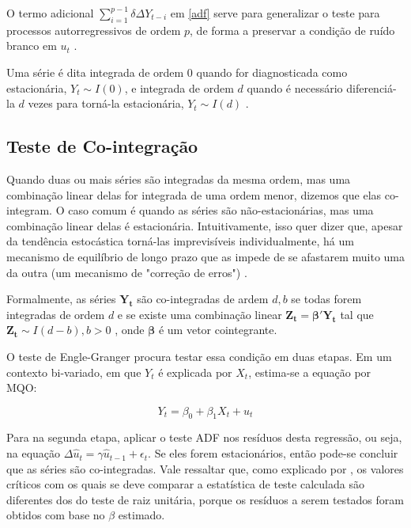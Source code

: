 \documentclass[a4paper,
               article,
               12pt,
               openany,
               oneside,
               english,
               brazil]{abntex2}
\numberwithin{equation}{section}
\begin{document}
    O termo adicional $ \sum_{i = 1}^{p-1}\delta \Delta Y_{t-i} $ em \eqref{adf} serve para generalizar o teste para processos autorregressivos de ordem $ p $, de forma a preservar a condição de ruído branco em $ u_t $ \cite[p.~40]{gustavo}.

    Uma série é dita integrada de ordem 0 quando for diagnosticada como estacionária, $ Y_t \sim I(0) $, e integrada de ordem $ d $ quando é necessário diferenciá-la $ d $ vezes para torná-la estacionária, $ Y_t \sim I(d) $ \cite[p.~740]{gujarati}.

    \subsection{Teste de Co-integração}

    Quando duas ou mais séries são integradas da mesma ordem, mas uma combinação linear delas for integrada de uma ordem menor, dizemos que elas co-integram. O caso comum é quando as séries são não-estacionárias, mas uma combinação linear delas é estacionária. Intuitivamente, isso quer dizer que, apesar da tendência estocástica torná-las imprevisíveis individualmente, há um mecanismo de equilíbrio de longo prazo que as impede de se afastarem muito uma da outra (um mecanismo de "correção de erros") \cite[p.~46]{gustavo}.

    Formalmente, as séries $ \mathbf{Y_t} $ são co-integradas de ardem $ d, b $ se todas forem integradas de ordem $ d $ e se existe uma combinação linear $ \mathbf{Z_t} = \pmb{\beta}'\mathbf{Y_t} $ tal que $ \mathbf{Z_t} \sim I(d - b), b > 0 $ \cite[p.~245]{lutkepool}, onde $ \pmb{\beta} $ é um vetor cointegrante.

    O teste de Engle-Granger procura testar essa condição em duas etapas. Em um contexto bi-variado, em que $ Y_t $ é explicada por $ X_t $, estima-se a equação por MQO:

    $$  Y_t = \beta_0 + \beta_1 X_t + u_t \label{engle-granger}$$

    Para na segunda etapa, aplicar o teste ADF nos resíduos desta regressão, ou seja, na equação $ \Delta \hat{u}_t = \gamma \hat{u}_{t-1} + \epsilon_{t} $. Se eles forem estacionários, então pode-se concluir que as séries são co-integradas. Vale ressaltar que, como explicado por , os valores críticos com os quais se deve comparar a estatística de teste calculada são diferentes dos do teste de raiz unitária, porque os resíduos a serem testados foram obtidos com base no $ \beta $ estimado.
\end{document}
